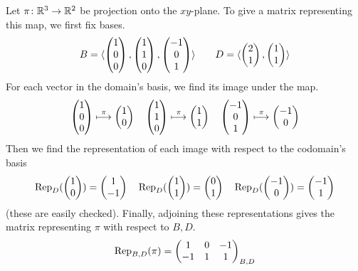 \begin{example}
Let \( \map{\pi}{\Re^3}{\Re^2} \) be projection onto the \( xy \)-plane.
To give a matrix representing this map, we first fix bases.
\begin{equation*}
  B=\sequence{
              \colvec{1 \\ 0 \\ 0},
              \colvec{1 \\ 1 \\ 0},
              \colvec{-1 \\ 0 \\ 1} }
  \qquad
  D=\sequence{
              \colvec{2 \\ 1},
              \colvec{1 \\ 1} }
\end{equation*}
For each vector in the domain's basis, we find its image under the map. 
\begin{equation*}
  \colvec{1 \\ 0 \\ 0}\mapsunder{\pi}\colvec{1 \\ 0}
  \quad
  \colvec{1 \\ 1 \\ 0}\mapsunder{\pi}\colvec{1 \\ 1}
  \quad
  \colvec{-1 \\ 0 \\ 1}\mapsunder{\pi}\colvec{-1 \\ 0}
\end{equation*}
Then we find the representation of each image with respect to the codomain's
basis 
\begin{equation*}
  \rep{\colvec{1 \\ 0}}{D}=\colvec{1 \\ -1}
  \quad
  \rep{\colvec{1 \\ 1}}{D}=\colvec{0 \\ 1}
  \quad
  \rep{\colvec{-1 \\ 0}}{D}=\colvec{-1 \\ 1}
\end{equation*}
(these are easily checked).
Finally, adjoining these representations gives the matrix representing 
\( \pi \) with respect to \( B,D \).
\begin{equation*}
    \rep{\pi}{B,D}
    =\begin{pmatrix}
      1  &0  &-1  \\
      -1 &1  &1
    \end{pmatrix}_{B,D}
\end{equation*}

\end{example}
